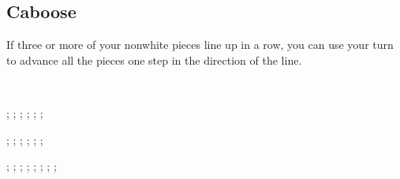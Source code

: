 \documentclass[../rulebook.tex]{subfiles}
\begin{document}
\subsection*{Caboose}

If three or more of your nonwhite pieces line up in a row,
you can use your turn to advance all the pieces one step in the direction of the line.

\

\begin{center}
\begin{struggleboard}
  ;
  ;
  ;
  ;
  ;
  ;
\end{struggleboard}
\begin{struggleboard}
  ;
  ;
  ;
  ;
  ;
  ;
\end{struggleboard}
\begin{struggleboard}
  ;
  ;
  ;
  ;
  ;
  ;
  ;
  ;
\end{struggleboard}
\end{center}
\end{document}
